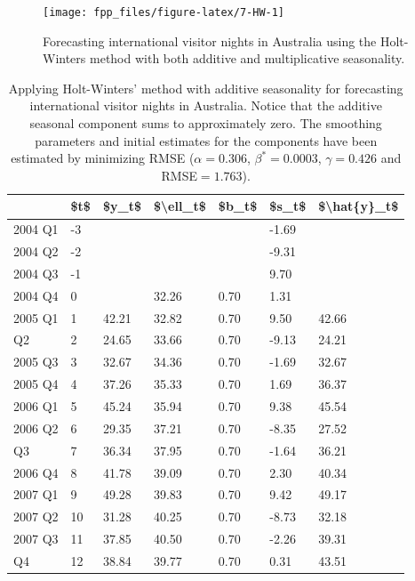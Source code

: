 \documentclass[]{book}
\begin{document}
\begin{figure}

{\centering \texttt{[image: fpp\_files/figure-latex/7-HW-1]} 

}

\caption{Forecasting international visitor nights in Australia using the Holt-Winters method with both additive and multiplicative seasonality.}\label{fig:7-HW}
\end{figure}

\begin{table}[t]

\caption{\label{tab:tab75}Applying Holt-Winters' method with additive seasonality for forecasting international visitor nights in Australia. Notice that the additive seasonal component sums to approximately zero. The smoothing parameters and initial estimates for the components have been estimated by minimizing RMSE ($\alpha=0.306$, $\beta^*=0.0003$, $\gamma=0.426$ and RMSE$=1.763$).}
\centering
\begin{tabular}{lllllll}
\toprule
  & \$t\$ & \$y\_t\$ & \$\textbackslash{}ell\_t\$ & \$b\_t\$ & \$s\_t\$ & \$\textbackslash{}hat\{y\}\_t\$\\
\midrule
2004 Q1 & -3 &  &  &  & -1.69 & \\
2004 Q2 & -2 &  &  &  & -9.31 & \\
2004 Q3 & -1 &  &  &  & 9.70 & \\
2004 Q4 & 0 &  & 32.26 & 0.70 & 1.31 & \\
2005 Q1 & 1 & 42.21 & 32.82 & 0.70 & 9.50 & 42.66\\
\addlinespace
2005 Q2 & 2 & 24.65 & 33.66 & 0.70 & -9.13 & 24.21\\
2005 Q3 & 3 & 32.67 & 34.36 & 0.70 & -1.69 & 32.67\\
2005 Q4 & 4 & 37.26 & 35.33 & 0.70 & 1.69 & 36.37\\
2006 Q1 & 5 & 45.24 & 35.94 & 0.70 & 9.38 & 45.54\\
2006 Q2 & 6 & 29.35 & 37.21 & 0.70 & -8.35 & 27.52\\
\addlinespace
2006 Q3 & 7 & 36.34 & 37.95 & 0.70 & -1.64 & 36.21\\
2006 Q4 & 8 & 41.78 & 39.09 & 0.70 & 2.30 & 40.34\\
2007 Q1 & 9 & 49.28 & 39.83 & 0.70 & 9.42 & 49.17\\
2007 Q2 & 10 & 31.28 & 40.25 & 0.70 & -8.73 & 32.18\\
2007 Q3 & 11 & 37.85 & 40.50 & 0.70 & -2.26 & 39.31\\
\addlinespace
2007 Q4 & 12 & 38.84 & 39.77 & 0.70 & 0.31 & 43.51\\

\end{tabular}
\end{table}
\end{document}
